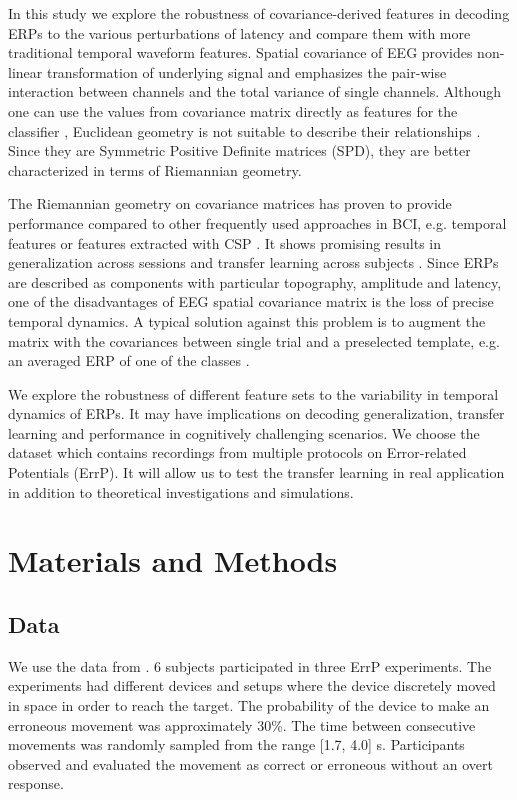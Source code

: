 \documentclass[12pt]{iopart}
\begin{document}
In this study we explore the robustness of covariance-derived features
in decoding ERPs to the various perturbations of latency
and compare them with more traditional temporal waveform features.
Spatial covariance of EEG provides non-linear transformation
of underlying signal and emphasizes the pair-wise interaction
between channels and the total variance of single channels.
Although one can use the values from covariance matrix
directly as features for the classifier \cite{tomioka_classifying_2007}, Euclidean geometry is not 
suitable to describe their relationships \cite{arsigny_geometric_2007}. 
Since they are 
Symmetric Positive Definite matrices (SPD),
they are better characterized in terms of Riemannian geometry.

The Riemannian geometry on covariance matrices has proven
to provide performance compared to other frequently used
approaches in BCI, e.g. temporal features or 
features extracted with CSP \cite{blankertz_optimizing_2008}.
It shows promising
results in generalization across sessions \cite{barachant_classification_2013}
and transfer learning across subjects \cite{zanini_transfer_2018}.
Since ERPs are described as components with particular topography,
amplitude and latency, one of the disadvantages of
EEG spatial covariance matrix is the loss of precise temporal dynamics.
A typical solution against this problem is to augment the matrix
with the covariances between single trial and a preselected template,
e.g. an averaged ERP of one of the classes \cite{congedo_new_2013,barachant_plug&play_2014}.

We explore the robustness of different feature sets to the variability
in temporal dynamics of ERPs. It may have implications on decoding 
generalization, transfer learning and performance in cognitively
challenging scenarios.
We choose the dataset which contains recordings from multiple protocols
on Error-related Potentials (ErrP). It will allow us to test
the transfer learning in real application in addition to theoretical
investigations and simulations.


\section{Materials and Methods}
\label{sec:methods}
\subsection{Data}
We use the data from \cite{iturrate_latency_2014-1}. 6 subjects participated in three ErrP experiments.
The experiments had different devices and setups where the device discretely moved in space
in order to reach the target. The probability of the device to make an erroneous
movement was approximately 30\%. The time between consecutive movements was randomly sampled
from the range [1.7, 4.0] s. Participants observed and evaluated the movement
as correct or erroneous without an overt response.
\end{document}
